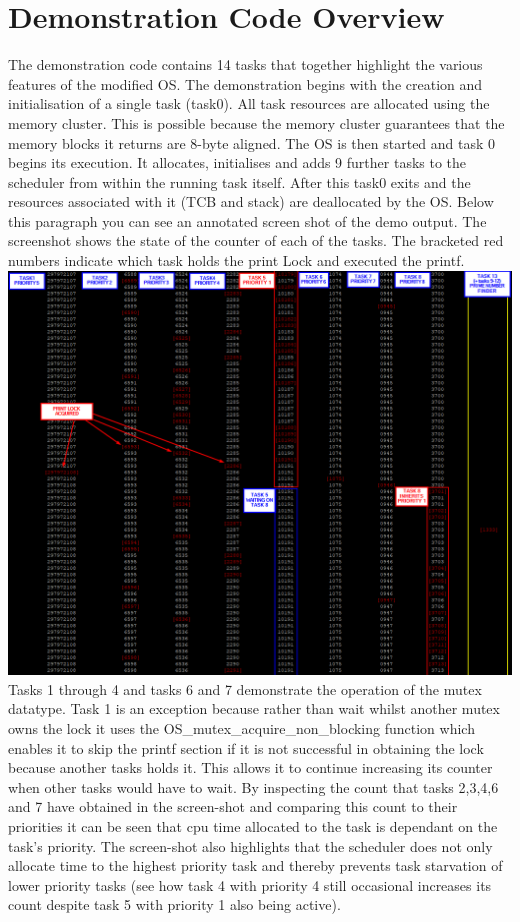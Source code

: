 \documentclass[12pt,a4paper]{article}
\begin{document}
\pagebreak
\section{Demonstration Code Overview}
The demonstration code contains 14 tasks that together highlight the various features of the modified OS. The demonstration begins with the creation and initialisation of a single task (task0). All task resources are allocated using the memory cluster. This is possible because the memory cluster guarantees that the memory blocks it returns are 8-byte aligned. The OS is then started and task 0 begins its execution. It allocates, initialises and adds 9 further tasks to the scheduler from within the running task itself. After this task0 exits and the resources associated with it (TCB and stack) are deallocated by the OS. Below this paragraph you can see an annotated screen shot of the demo output. The screenshot shows the state of the counter of each of the tasks. The bracketed red numbers indicate which task holds the print Lock and executed the printf.\\

\includegraphics[width=\textwidth]{images/priorityInheritance.png}\\

Tasks 1 through 4 and tasks 6 and 7 demonstrate the operation of the mutex datatype. Task 1 is an exception because rather than wait whilst another mutex owns the lock it uses the OS\_mutex\_acquire\_non\_blocking function which enables it to skip the printf section if it is not successful in obtaining the lock because another tasks holds it. This allows it to continue increasing its counter when other tasks would have to wait. By inspecting the count that tasks 2,3,4,6 and 7 have obtained in the screen-shot and comparing this count to their priorities it can be seen that cpu time allocated to the task is dependant on the task's priority. The screen-shot also highlights that the scheduler does not only allocate time to the highest priority task and thereby prevents task starvation of lower priority tasks (see how task 4 with priority 4 still occasional increases its count despite task 5 with priority 1 also being active).\\
\end{document}
